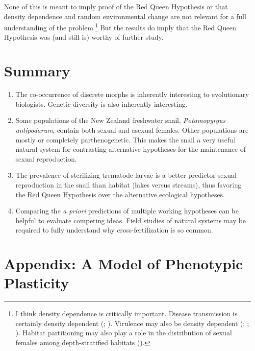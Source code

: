 \documentclass[
  letterpaper,
]{book}
\providecommand{\tightlist}{%
  \setlength{\itemsep}{0pt}\setlength{\parskip}{0pt}}\usepackage{longtable,booktabs,array}
\begin{document}
None of this is meant to imply proof of the Red Queen Hypothesis or that
density dependence and random environmental change are not relevant for
a full understanding of the problem.\footnote{I think density dependence
  is critically important. Disease transmission is certainly density
  dependent (;
  ). Virulence may also be
  density dependent (;
  ;
  ). Habitat partitioning may
  also play a role in the distribution of sexual females among
  depth-stratified habitats ().} But the results do imply that the Red Queen Hypothesis
was (and still is) worthy of further study.

\section{Summary}\label{summary-2}

\begin{enumerate}
\def\labelenumi{\arabic{enumi}.}
\tightlist
\item
  The co-occurrence of discrete morphs is inherently interesting to
  evolutionary biologists. Genetic diversity is also inherently
  interesting.
\item
  Some populations of the New Zealand freshwater snail,
  \emph{Potamopyrgus antipodarum}, contain both sexual and asexual
  females. Other populations are mostly or completely parthenogenetic.
  This makes the snail a very useful natural system for contrasting
  alternative hypotheses for the maintenance of sexual reproduction.
\item
  The prevalence of sterilizing trematode larvae is a better predictor
  sexual reproduction in the snail than habitat (lakes versus streams),
  thus favoring the Red Queen Hypothesis over the alternative ecological
  hypotheses.
\item
  Comparing the \emph{a priori} predictions of multiple working
  hypotheses can be helpful to evaluate competing ideas. Field studies
  of natural systems may be required to fully understand why
  cross-fertilization is so common.
\end{enumerate}

\section{Appendix: A Model of Phenotypic Plasticity}\label{sec-app-3}
\end{document}
